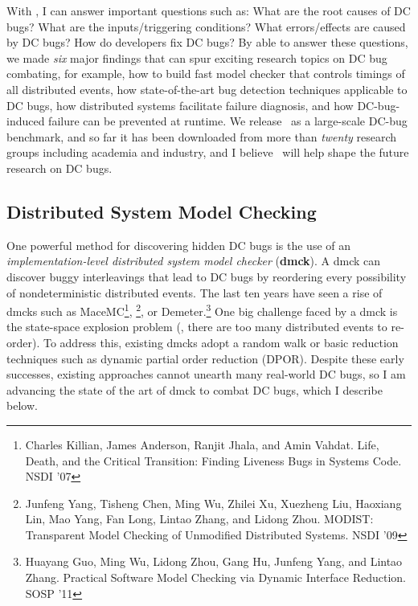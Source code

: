 \documentclass[10pt]{article}
\begin{document}

With \taxdc, I can answer important questions such as: 
%
What are the root causes of DC bugs?
%
What are the inputs/triggering conditions? 
%
What errors/effects are caused by DC bugs?
%
How do developers fix DC bugs? 
%
By able to answer these questions, we made \textit{six} major findings that can
spur exciting research topics on DC bug combating, for example, 
%
how to build fast model checker that controls timings of all distributed events, 
%
how state-of-the-art bug detection techniques applicable to DC bugs, 
%
how distributed systems facilitate failure diagnosis, 
%
and how DC-bug-induced failure can be prevented at runtime.
%
We release \taxdc\ as a large-scale DC-bug benchmark, and so far it has been
downloaded from more than \textit{twenty} research groups including academia
and industry, and I believe \taxdc\ will help shape the future research on DC
bugs.



\subsection{Distributed System Model Checking}

One powerful method for discovering hidden DC bugs is the use of an
\textit{implementation-level distributed system model checker} (\textbf{dmck}).
A dmck can discover buggy interleavings that lead to DC bugs by reordering
every possibility of nondeterministic distributed events. The last ten years
have seen a rise of dmcks such as 
%
MaceMC\footnote{Charles Killian, James Anderson, Ranjit Jhala,
and Amin Vahdat. Life, Death, and the Critical Transition: Finding Liveness Bugs
in Systems Code. NSDI '07}, 
%
\modist\footnote{Junfeng Yang, Tisheng Chen, Ming
Wu, Zhilei Xu, Xuezheng Liu, Haoxiang Lin, Mao Yang, Fan Long, Lintao Zhang, and
Lidong Zhou. MODIST: Transparent Model Checking of Unmodified Distributed
Systems. NSDI '09}, or Demeter.\footnote{Huayang Guo, Ming Wu, Lidong Zhou, Gang
Hu, Junfeng Yang, and Lintao Zhang. Practical Software Model Checking via
Dynamic Interface Reduction. SOSP '11} One big challenge faced by a dmck is the
state-space explosion problem (\ie, there are too many distributed events to
re-order). To address this, existing dmcks adopt a random walk or basic
reduction techniques such as dynamic partial order reduction (DPOR). Despite
these early successes, existing approaches cannot unearth many real-world DC
bugs, so I am advancing the state of the art of dmck to combat DC bugs, which I
describe below.
\end{document}
